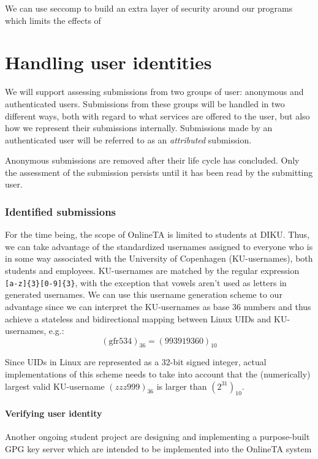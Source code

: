 We can use seccomp to build an extra layer of security around our
programs which limits the effects of 


\section{Handling user identities}
We will support assessing submissions from two groups of user:
anonymous and authenticated users. Submissions from these groups will
be handled in two different ways, both with regard to what services
are offered to the user, but also how we represent their submissions
internally. Submissions made by an authenticated user will be referred
to as an \textit{attributed} submission.

Anonymous submissions are removed after their life cycle has
concluded. Only the assessment of the submission persists until it has
been read by the submitting user.


\subsubsection{Identified submissions}
For the time being, the scope of OnlineTA is limited to students at
DIKU. Thus, we can take advantage of the standardized usernames
assigned to everyone who is in some way associated with the University
of Copenhagen (KU-usernames), both students and
employees. KU-usernames are matched by the regular expression
\texttt{[a-z]\{3\}[0-9]\{3\}}, with the exception that vowels aren't used
as letters in generated usernames. We can use this
username generation scheme to our advantage since we can interpret the
KU-usernames as base 36 numbers and thus achieve a stateless and
bidirectional mapping between Linux UIDs and KU-usernames, e.g.:
\begin{equation*}
(\text{gfr534})_{36} = (993919360)_{10}
\end{equation*}

Since UIDs in Linux are represented as a 32-bit signed integer, actual
implementations of this scheme needs to take into account that the
(numerically) largest valid KU-username $(zzz999)_{36}$ is larger than
$(2^{31})_{10}$.

\paragraph{Verifying user identity}
Another ongoing student project are designing and implementing a
purpose-built GPG key server which are intended to be implemented into
the OnlineTA system


